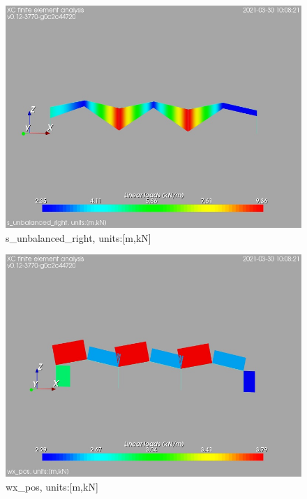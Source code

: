 \begin{figure}
\begin{center}
\includegraphics[width=\linewidth]{calc_results/sole_zeinali/text/graphics/loads/s_unbalanced_rightallMemberSet}
\caption{s_unbalanced_right, units:[m,kN]}
\label{s-unbalanced-right-unitsmkn}
\end{center}
\end{figure}
\begin{figure}
\begin{center}
\includegraphics[width=\linewidth]{calc_results/sole_zeinali/text/graphics/loads/wx_posallMemberSet}
\caption{wx_pos, units:[m,kN]}
\label{wx-pos-unitsmkn}
\end{center}
\end{figure}
